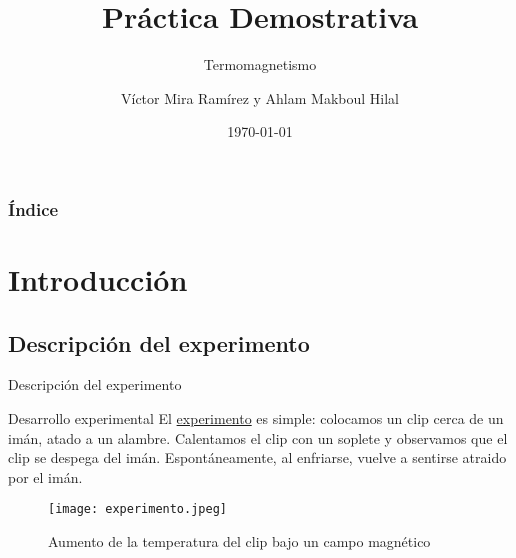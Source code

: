 \documentclass[10pt]{beamer}
\title[Universidad de Alicante]{\textrm{\textbf{Práctica Demostrativa}}}
\subtitle{\textrm{Termomagnetismo}}
\author[vmr48@alu.ua.es y amhm10@alu.ua.es]{\textrm{Víctor Mira Ramírez y Ahlam Makboul Hilal}}
\institute[]{\textrm{Universidad de Alicante}}
\date[\today]{\textrm{\today}}
\begin{document}
\frame{\titlepage}
\begin{frame}
\frametitle{\textrm{Índice}}
\tableofcontents
\end{frame}
\section{\textrm{Introducción}}
    \subsection{\textrm{Descripción del experimento}}
        \begin{frame}{\textrm{Descripción del experimento}}
            \begin{block}{Desarrollo experimental}
                El \href{https://youtu.be/rLcoyuIqBuM}{experimento} es simple: colocamos un clip cerca de un imán, atado a un alambre. Calentamos el clip con un soplete y observamos que el clip se despega del imán. Espontáneamente, al enfriarse, vuelve a sentirse atraido por el imán.
            \end{block}
            \begin{figure}
                \centering
                \texttt{[image: experimento.jpeg]}
                \caption{Aumento de la temperatura del clip bajo un campo magnético}
                \label{fig:experimento}
            \end{figure}
        \end{frame}
\end{document}
